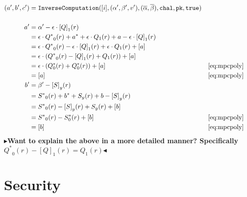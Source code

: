 \documentclass[twoside,11pt,openright]{report}
\theoremstyle{definition}
\theoremstyle{plain}
\newcommand{\todo}[1]{{\color[rgb]{.5,0,0}\textbf{$\blacktriangleright$#1$\blacktriangleleft$}}}
\begin{document}
\begin{align*}
  (a', b', c') & = \texttt{InverseComputation}([i], (\alpha', \beta', v'),
  (\overline{\alpha}, \overline{\beta}), \texttt{chal}, \texttt{pk}, \texttt{true})                                                  \\\\
  a'           & = \alpha' - \epsilon \cdot {[Q]}_1(r)                                                                               \\
               & = \epsilon \cdot {Q^*}_0(r) + a^* + \epsilon \cdot Q_1(r) + a - \epsilon \cdot {[Q]}_1(r)                           \\
               & = \epsilon \cdot {Q^*}_0(r) - \epsilon \cdot {[Q]}_1(r) + \epsilon \cdot Q_1(r) + [a]                               \\
               & = \epsilon \cdot ({Q^*}_0(r) - {[Q]}_1(r) +  Q_1(r)) + [a]                                                          \\
               & = \epsilon \cdot (Q^*_0(r) +  Q^*_0(r)) + [a]                                             &  & \autoref{eq:mpcpoly} \\
               & = [a]                                                                                     &  & \autoref{eq:mpcpoly} \\
  b'           & = \beta' - {[S]}_y(r)                                                                                               \\
               & = {S^*}_0(r) + b^* + S_y(r) + b - {[S]}_y(r)                                                                        \\
               & = {S^*}_0(r) - {[S]}_y(r) + S_y(r)  + [b]                                                                           \\
               & = {S^*}_0(r) - S^*_0(r)  + [b]                                                            &  & \autoref{eq:mpcpoly} \\
               & = [b]                                                                                     &  & \autoref{eq:mpcpoly} \\
\end{align*}
\todo{Want to explain the above in a more detailed manner? Specifically ${Q^*}_0(r) - {[Q]}_1(r) = Q_1(r)$}

\section{Security}
\end{document}
